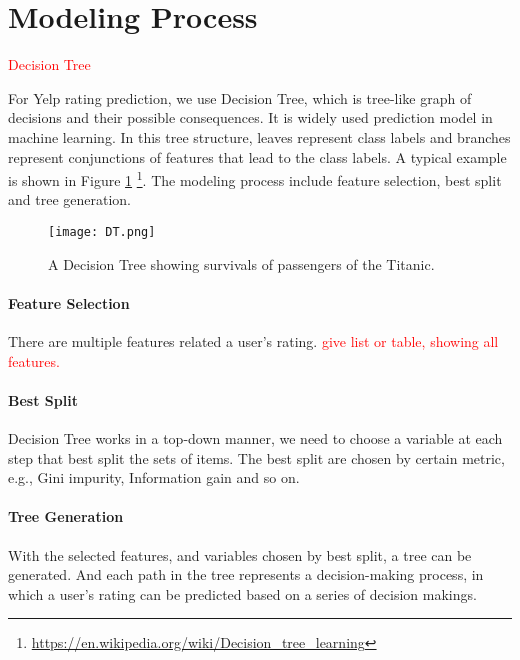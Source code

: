 \section{Modeling Process}
\label{sec:modeling} 

\textcolor{red}{Decision Tree}

For Yelp rating prediction, we use Decision Tree, which is tree-like graph of decisions and their possible consequences. It is widely used prediction model in machine learning. In this tree structure, leaves represent class labels and branches represent conjunctions of features that lead to the class labels. A typical example is shown in Figure \ref{fig:DT} \footnote{\url{https://en.wikipedia.org/wiki/Decision_tree_learning}}. The modeling process include feature selection, best split and tree generation. 

\begin{figure}[h]
	\centering
	\texttt{[image: DT.png]}
	\caption{A Decision Tree showing survivals of passengers of the Titanic.}
	\label{fig:DT}
\end{figure}

\paragraph{Feature Selection}
There are multiple features related a user's rating. \textcolor{red}{give list or table, showing all features. }

\paragraph{Best Split}
Decision Tree works in a top-down manner, we need to choose a variable at each step that best split the sets of items. The best split are chosen by certain metric, e.g., Gini impurity, Information gain and so on. 

\paragraph{Tree Generation}
With the selected features, and variables chosen by best split, a tree can be generated. And each path in the tree represents a decision-making process, in which a user's rating can be predicted based on a series of decision makings. 